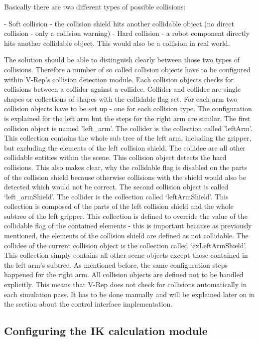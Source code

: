 Basically there are two different types of possible collisions:

- Soft collision - the collision shield hits another collidable object 
  (no direct collision - only a collision warning)
- Hard collision - a robot component directly hits another collidable object. This would also
  be a collision in real world.

The solution should be able to distinguish clearly between those two types of collisions. Therefore a number of so called collision objects have to be configured within V-Rep's collision detection module. Each collision objects checks for collisions between a collider against a collidee. Collider and collidee are single shapes or collections of shapes with the collidable flag set. For each arm two collision objects have to be set up - one for each collision type. The configuration is explained for the left arm but the steps for the right arm are similar. The first collision object is named 'left\_arm'. The collider is the collection called 'leftArm'. This collection contains the whole sub tree of the left arm, including the gripper, but excluding the elements of the left collision shield. The collidee are all other collidable entities within the scene. This collision object detects the hard collisions. This also makes clear, why the collidable flag is disabled on the parts of the collision shield because otherwise collisions with the shield would also be detected which would not be correct. The second collision object is called `left\_armShield'. The collider is the collection called `leftArmShield'. This collection is composed of the parts of the left collision shield and the whole subtree of the left gripper. This collection is defined to override the value of the collidable flag of the contained elements - this is important because as previously mentioned, the elements of the collision shield are defined as not collidable. The collidee of the current collision object is the collection called `exLeftArmShield'. This collection simply contains all other scene objects except those contained in the left arm's subtree. As mentioned before, the same configuration steps happened for the right arm. All collision objects are defined not to be handled explicitly. This means that V-Rep does not check for collisions automatically in each simulation pass. It has to be done manually and will be explained later on in the section about the control interface implementation. 

\subsection{Configuring the IK calculation module}

